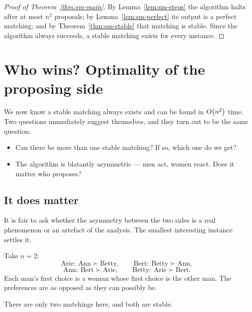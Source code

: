 \begin{proof}[Proof of Theorem~\ref{thm:sm-main}]
By Lemma~\ref{lem:sm-steps} the algorithm halts after at most $n^2$
proposals; by Lemma~\ref{lem:sm-perfect} its output is a perfect matching; and
by Theorem~\ref{thm:sm-stable} that matching is stable. Since the algorithm
always succeeds, a stable matching exists for every instance.
\end{proof}

\section{Who wins? Optimality of the proposing side}\label{sec:sm-optimality}

We now know a stable matching always exists and can be found in $O\!\left(n^2\right)$
time. Two questions immediately suggest themselves, and they turn out to be
the same question:

\begin{itemize}[nosep]
  \item Can there be more than one stable matching? If so, which one do we get?
  \item The algorithm is blatantly asymmetric --- men act, women react. Does it
        matter who proposes?
\end{itemize}

\subsection{It does matter}

It is fair to ask whether the asymmetry between the two sides is a real
phenomenon or an artefact of the analysis. The smallest interesting instance
settles it.

\begin{example}\label{ex:sm-2x2}
Take $n = 2$:
\[
  \text{Arie}:\ \text{Ann} \succ \text{Betty}, \qquad
  \text{Bert}:\ \text{Betty} \succ \text{Ann},
\]
\[
  \text{Ann}:\ \text{Bert} \succ \text{Arie}, \qquad
  \text{Betty}:\ \text{Arie} \succ \text{Bert}.
\]
Each man's first choice is a woman whose first choice is the other man. The
preferences are as opposed as they can possibly be.
\end{example}

There are only two matchings here, and both are stable.

